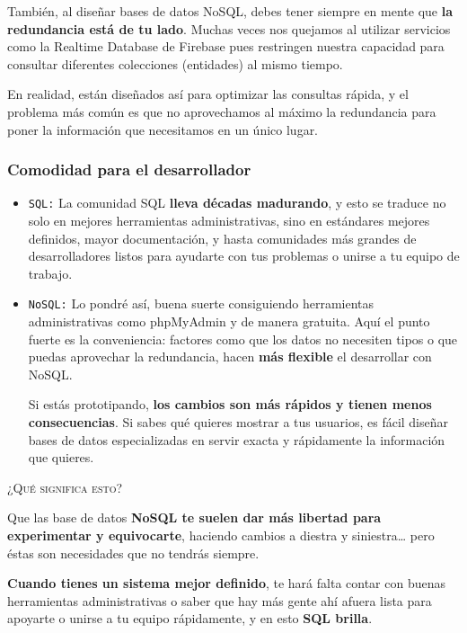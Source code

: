 También, al diseñar bases de datos NoSQL, debes tener siempre en mente que \textbf{la redundancia está de tu lado}. Muchas veces nos quejamos al utilizar servicios como la Realtime Database de Firebase pues restringen nuestra capacidad para consultar diferentes colecciones (entidades) al mismo tiempo.

En realidad, están diseñados así para optimizar las consultas rápida, y el problema más común es que no aprovechamos al máximo la redundancia para poner la información que necesitamos en un único lugar.

\subsubsection*{Comodidad para el desarrollador}

\begin{itemize}


\item \texttt{SQL:} La comunidad SQL \textbf{lleva décadas madurando}, y esto se traduce no solo en mejores herramientas administrativas, sino en estándares mejores definidos, mayor documentación, y hasta comunidades más grandes de desarrolladores listos para ayudarte con tus problemas o unirse a tu equipo de trabajo.

\item \texttt{NoSQL:} Lo pondré así, buena suerte consiguiendo herramientas administrativas como phpMyAdmin y de manera gratuita. Aquí el punto fuerte es la conveniencia: factores como que los datos no necesiten tipos o que puedas aprovechar la redundancia, hacen \textbf{más flexible} el desarrollar con NoSQL.

Si estás prototipando, \textbf{los cambios son más rápidos y tienen menos consecuencias}. Si sabes qué quieres mostrar a tus usuarios, es fácil diseñar bases de datos especializadas en servir exacta y rápidamente la información que quieres.

\end{itemize}

\textsc{¿Qué significa esto?}

Que las base de datos \textbf{NoSQL te suelen dar más libertad para experimentar y equivocarte}, haciendo cambios a diestra y siniestra… pero éstas son necesidades que no tendrás siempre.

\textbf{Cuando tienes un sistema mejor definido}, te hará falta contar con buenas herramientas administrativas o saber que hay más gente ahí afuera lista para apoyarte o unirse a tu equipo rápidamente, y en esto \textbf{SQL brilla}.

